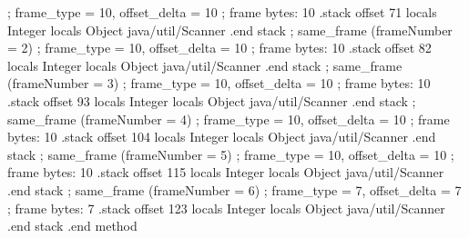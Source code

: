 \documentclass[12pt,a4paper,twoside]{report}
\begin{document}
\begin{terminal}
  ; frame_type = 10, offset_delta = 10
  ; frame bytes: 10
  .stack
    offset 71
    locals Integer
    locals Object java/util/Scanner
    .end stack
  ; same_frame (frameNumber = 2)
  ; frame_type = 10, offset_delta = 10
  ; frame bytes: 10
  .stack
    offset 82
    locals Integer
    locals Object java/util/Scanner
    .end stack
  ; same_frame (frameNumber = 3)
  ; frame_type = 10, offset_delta = 10
  ; frame bytes: 10
  .stack
    offset 93
    locals Integer
    locals Object java/util/Scanner
    .end stack
  ; same_frame (frameNumber = 4)
  ; frame_type = 10, offset_delta = 10
  ; frame bytes: 10
  .stack
    offset 104
    locals Integer
    locals Object java/util/Scanner
    .end stack
  ; same_frame (frameNumber = 5)
  ; frame_type = 10, offset_delta = 10
  ; frame bytes: 10
  .stack
    offset 115
    locals Integer
    locals Object java/util/Scanner
    .end stack
  ; same_frame (frameNumber = 6)
  ; frame_type = 7, offset_delta = 7
  ; frame bytes: 7
  .stack
    offset 123
    locals Integer
    locals Object java/util/Scanner
    .end stack
.end method

\end{terminal}
\end{document}
